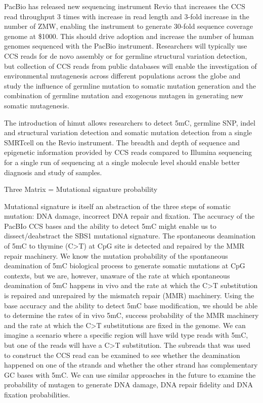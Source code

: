 PacBio has released new sequencing instrument Revio that increases the CCS read throughput 3 times with increase in read length and 3-fold increase in the number of ZMW, enabling the instrument to generate 30-fold sequence coverage genome at \$1000. This should drive adoption and increase the number of human genomes sequenced with the PacBio instrument. Researchers will typically use CCS reads for de novo assembly or for germline structural variation detection, but collection of CCS reads from public databases will enable the investigation of environmental mutagenesis across different populations across the globe and study the influence of germline mutation to somatic mutation generation and the combination of germline mutation and exogenous mutagen in generating new somatic mutagenesis. 

The introduction of himut allows researchers to detect 5mC, germline SNP, indel and structural variation detection and somatic mutation detection from a single SMRTcell on the Revio instrument. The breadth and depth of sequence and epigenetic information provided by CCS reads compared to Illumina sequencing for a single run of sequencing at a single molecule level should enable better diagnosis and study of samples. 

Three Matrix = Mutational signature probability 

Mutational signature is itself an abstraction of the three steps of somatic mutation: DNA damage, incorrect DNA repair and fixation. The accuracy of the PacBIo CCS bases and the ability to detect 5mC might enable us to dissect/deabstract the SBS1 mutational signature. The spontaneous deamination of 5mC to thymine (C>T) at CpG site is detected and repaired by the MMR repair machinery. We know the mutation probability of the spontaneous deamination of 5mC biological process to generate somatic mutations at CpG contexts, but we are, however, unaware of the rate at which spontaneous deamination of 5mC happens in vivo and the rate at which the C>T substitution is repaired and unrepaired by the mismatch repair (MMR) machinery. Using the base accuracy and the ability to detect 5mC base modification, we should be able to determine the rates of in vivo 5mC, success probability of the MMR machinery and the rate at which the C>T substitutions are fixed in the genome. We can imagine a scenario where a specific region will have wild type reads with 5mC, but one of the reads will have a C>T substitution. The subreads that was used to construct the CCS read can be examined to see whether the deamination happened on one of the strands and whether the other strand has complementary GC bases with 5mC. We can use similar approaches in the future to examine the probability of mutagen to generate DNA damage, DNA repair fidelity and DNA fixation probabilities. 

